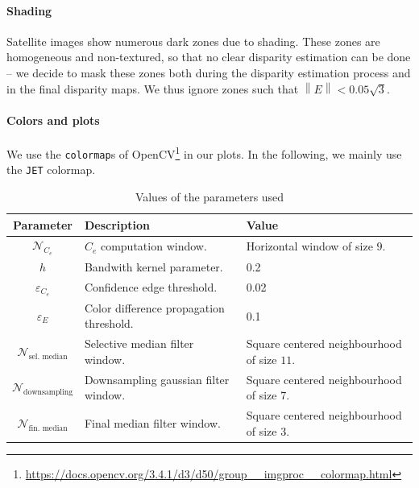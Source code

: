 \documentclass{article}
\newcommand{\norm}[1]{\left\lVert#1\right\rVert}
\theoremstyle{definition}
\begin{document}
\paragraph{Shading} Satellite images show numerous dark zones due to shading. These zones are homogeneous and non-textured, so that no clear disparity estimation can be done -- we decide to mask these zones both during the disparity estimation process and in the final disparity maps. We thus ignore zones such that $\norm{E} < 0.05 \sqrt{3}$.


\paragraph{Colors and plots} We use the \verb#colormap#s of OpenCV\footnote{\url{https://docs.opencv.org/3.4.1/d3/d50/group__imgproc__colormap.html}} in our plots. In the following, we mainly use the \verb#JET# colormap.%



\begin{table}[ht]
 \centering
 \begin{tabular}{|c|l|l|}
  \hline
  \textbf{Parameter} & \textbf{Description} & \textbf{Value}\\
  \hline \hline 
  $\mathcal{N}_{C_e}$ & $C_e$ computation window. &  Horizontal window of size $9$.\\
  \hline 
  $h$ & Bandwith kernel parameter. & 0.2 \\
  \hline 
  $\varepsilon_{C_e}$ & Confidence edge threshold. & 0.02 \\
  \hline 
  $\varepsilon_E$ & Color difference propagation threshold. & 0.1 \\
  \hline 
  $\mathcal{N}_\text{sel. median}$ & Selective median filter window. & Square centered neighbourhood of size $11$. \\
  \hline 
  $\mathcal{N}_\text{downsampling}$ & Downsampling gaussian filter window. & Square centered neighbourhood of size $7$.\\
  \hline 
  $\mathcal{N}_\text{fin. median}$ & Final median filter window. & Square centered neighbourhood of size $3$.\\
  \hline
 \end{tabular}
 \caption{Values of the parameters used}
 \label{table:parameters}
\end{table}
\end{document}
